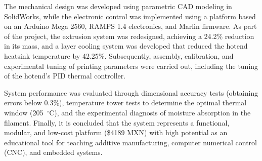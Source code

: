 The mechanical design was developed using parametric CAD modeling in 
SolidWorks, while the electronic control was implemented using a platform 
based on an Arduino Mega 2560, RAMPS 1.4 electronics, and Marlin firmware. 
As part of the project, the extrusion system was redesigned, achieving a 
24.2\% reduction in its mass, and a layer cooling system was developed that 
reduced the hotend heatsink temperature by 42.25\%. Subsequently, assembly, 
calibration, and experimental tuning of printing parameters were carried out, 
including the tuning of the hotend's PID thermal controller.

System performance was evaluated through dimensional accuracy tests 
(obtaining errors below 0.3\%), temperature tower tests to determine the 
optimal thermal window (205~$^\circ$C), and the experimental diagnosis of 
moisture absorption in the filament. Finally, it is concluded that the system 
represents a functional, modular, and low-cost platform (\$4189 MXN) with 
high potential as an educational tool for teaching additive manufacturing, 
computer numerical control (CNC), and embedded systems.